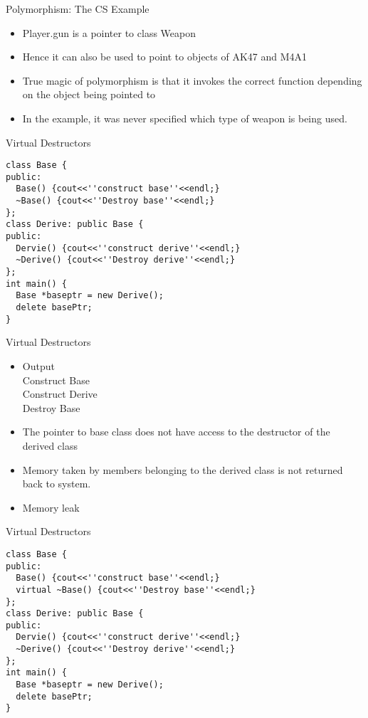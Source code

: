 \documentclass{beamer}
\begin{document}
\begin{frame}[fragile]{Polymorphism: The CS Example}
  \begin{itemize}
    \item Player.gun is a pointer to class Weapon\pause
    \item Hence it can also be used to point to objects of AK47 and M4A1\pause
    \item True magic of polymorphism is that it invokes the correct function depending on the object being pointed to \pause
    \item In the example, it was never specified which type of weapon is being used.
  \end{itemize}
\end{frame}

\begin{frame}[fragile]{Virtual Destructors}
  \begin{lstlisting}
class Base {
public:
  Base() {cout<<''construct base''<<endl;}
  ~Base() {cout<<''Destroy base''<<endl;}
};
class Derive: public Base {
public:
  Dervie() {cout<<''construct derive''<<endl;}
  ~Derive() {cout<<''Destroy derive''<<endl;}
};
int main() {
  Base *baseptr = new Derive();
  delete basePtr;
}
  \end{lstlisting}
\end{frame}

\begin{frame}[fragile]{Virtual Destructors}
  \begin{itemize}
    \item Output\\
      Construct Base\\
      Construct Derive\\
      Destroy Base\pause
    \item The pointer to base class does not have access to the destructor of the derived class\pause
    \item Memory taken by members belonging to the derived class is not returned back to system.\pause
    \item Memory leak
  \end{itemize}
\end{frame}

\begin{frame}[fragile]{Virtual Destructors}
  \begin{lstlisting}
class Base {
public:
  Base() {cout<<''construct base''<<endl;}
  virtual ~Base() {cout<<''Destroy base''<<endl;}
};
class Derive: public Base {
public:
  Dervie() {cout<<''construct derive''<<endl;}
  ~Derive() {cout<<''Destroy derive''<<endl;}
};
int main() {
  Base *baseptr = new Derive();
  delete basePtr;
}
  \end{lstlisting}
\end{frame}
\end{document}
